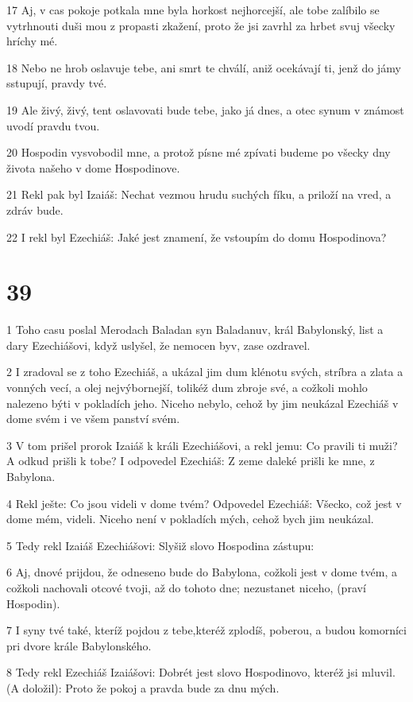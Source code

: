 \par 17 Aj, v cas pokoje potkala mne byla horkost nejhorcejší, ale tobe zalíbilo se vytrhnouti duši mou z propasti zkažení, proto že jsi zavrhl za hrbet svuj všecky hríchy mé.
\par 18 Nebo ne hrob oslavuje tebe, ani smrt te chválí, aniž ocekávají ti, jenž do jámy sstupují, pravdy tvé.
\par 19 Ale živý, živý, tent oslavovati bude tebe, jako já dnes, a otec synum v známost uvodí pravdu tvou.
\par 20 Hospodin vysvobodil mne, a protož písne mé zpívati budeme po všecky dny života našeho v dome Hospodinove.
\par 21 Rekl pak byl Izaiáš: Nechat vezmou hrudu suchých fíku, a priloží na vred, a zdráv bude.
\par 22 I rekl byl Ezechiáš: Jaké jest znamení, že vstoupím do domu Hospodinova?

\chapter{39}

\par 1 Toho casu poslal Merodach Baladan syn Baladanuv, král Babylonský, list a dary Ezechiášovi, když uslyšel, že nemocen byv, zase ozdravel.
\par 2 I zradoval se z toho Ezechiáš, a ukázal jim dum klénotu svých, stríbra a zlata a vonných vecí, a olej nejvýbornejší, tolikéž dum zbroje své, a cožkoli mohlo nalezeno býti v pokladích jeho. Niceho nebylo, cehož by jim neukázal Ezechiáš v dome svém i ve všem panství svém.
\par 3 V tom prišel prorok Izaiáš k králi Ezechiášovi, a rekl jemu: Co pravili ti muži? A odkud prišli k tobe? I odpovedel Ezechiáš: Z zeme daleké prišli ke mne, z Babylona.
\par 4 Rekl ješte: Co jsou videli v dome tvém? Odpovedel Ezechiáš: Všecko, což jest v dome mém, videli. Niceho není v pokladích mých, cehož bych jim neukázal.
\par 5 Tedy rekl Izaiáš Ezechiášovi: Slyšiž slovo Hospodina zástupu:
\par 6 Aj, dnové prijdou, že odneseno bude do Babylona, cožkoli jest v dome tvém, a cožkoli nachovali otcové tvoji, až do tohoto dne; nezustanet niceho, (praví Hospodin).
\par 7 I syny tvé také, kteríž pojdou z tebe,kteréž zplodíš, poberou, a budou komorníci pri dvore krále Babylonského.
\par 8 Tedy rekl Ezechiáš Izaiášovi: Dobrét jest slovo Hospodinovo, kteréž jsi mluvil. (A doložil): Proto že pokoj a pravda bude za dnu mých.

